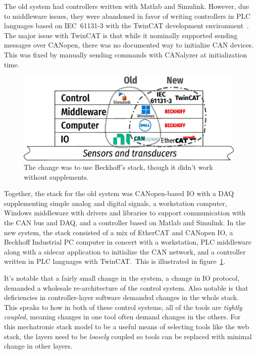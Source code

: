 \documentclass[english,12pt,a4paper,pdftex,eng,utf8]{aaltothesis}
\begin{document}
The old system had controllers written with Matlab and Simulink.  However, due to middleware issues, they were abandoned in favor of writing controllers in PLC languages based on IEC~61131-3 with the TwinCAT development environment~\cite{IEC61131-3, BeckhoffTwinCAT}.  The major issue with TwinCAT is that while it nominally supported sending messages over CANopen, there was no documented way to initialize CAN devices.  This was fixed by manually sending commands with CANalyzer at initialization time.

\begin{figure}[h]
  \centering
  \includegraphics[width=\textwidth]{assets/mechatronic_tech_stack_dolores}
  \caption{The change was to use Beckhoff's stack, though it didn't work without supplements.}\label{fig:mechatronic_tech_stack_dolores}
\end{figure}

Together, the stack for the old system was CANopen-based IO with a DAQ supplementing simple analog and digital signals, a workstation computer, Windows middleware with drivers and libraries to support communication with the CAN bus and DAQ, and a controller based on Matlab and Simulink.  In the new system, the stack consisted of a mix of EtherCAT and CANopen IO, a Beckhoff Industrial PC computer in concert with a workstation, PLC middleware along with a sidecar application to initialize the CAN network, and a controller written in PLC languages with TwinCAT.\  This is illustrated in figure~\ref{fig:mechatronic_tech_stack_dolores}.

It's notable that a fairly small change in the system, a change in IO protocol, demanded a wholesale re-architecture of the control system.  Also notable is that deficiencies in controller-layer software demanded changes in the whole stack.  This speaks to how in both of these control systems, all of the tools are {\it tightly coupled}, meaning changes in one tool often demand changes in the others.  For this mechatronic stack model to be a useful means of selecting tools like the web stack, the layers need to be {\it loosely\/} coupled so tools can be replaced with minimal change in other layers.
\end{document}

